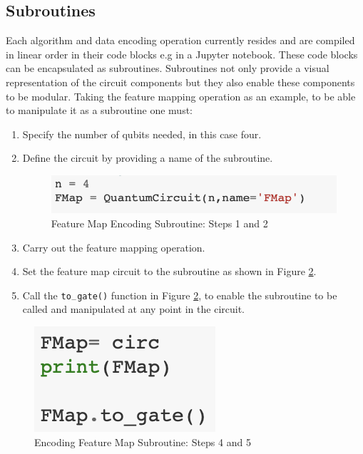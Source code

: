 \subsection{Subroutines}
Each algorithm and data encoding operation currently resides and are compiled in linear order in their code blocks e.g in a Jupyter notebook. These code blocks can be encapsulated as subroutines. Subroutines not only provide a visual representation of the circuit components but they also enable these components to be modular.
Taking the feature mapping operation as an example, to be able to manipulate it as a subroutine one must:

\begin{enumerate}

\item Specify the number of qubits needed, in this case four.

\item Define the circuit by providing a name of the subroutine.

\begin{figure}[H]
      \centering
      \includegraphics[scale=0.8]{background/SubR1.png}
      \caption{Feature Map Encoding Subroutine: Steps 1 and 2}
      \label{SUR1}
\end{figure}


\item Carry out the feature mapping operation.

\item Set the feature map circuit to the subroutine as shown in Figure \ref{SUR2}.

\item Call the \texttt{to$_-$gate()} function in Figure \ref{SUR2}, to enable the subroutine to be called and manipulated at any point in the circuit. 

\end{enumerate}

\begin{figure}[H]
      \centering
      \includegraphics[scale=0.8]{background/SubR2.png}
      \caption{Encoding Feature Map Subroutine: Steps 4 and 5}
      \label{SUR2}
\end{figure}

